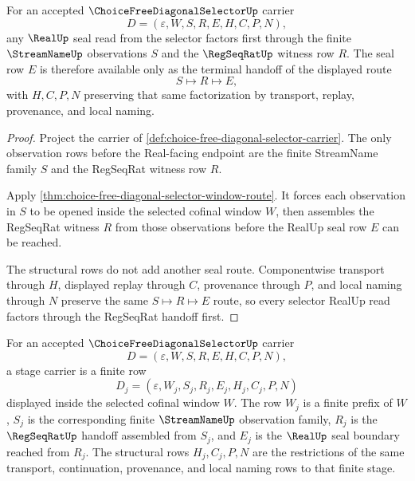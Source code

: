 \begin{theorem}
\label{thm:choice-free-diagonal-selector-regseqrat-seal-factorization}
For an accepted $\ChoiceFreeDiagonalSelectorUp$ carrier
$$
D=(\varepsilon,W,S,R,E,H,C,P,N),
$$
any $\RealUp$ seal read from the selector factors first through the finite $\StreamNameUp$ observations $S$ and the $\RegSeqRatUp$ witness row $R$. The seal row $E$ is therefore available only as the terminal handoff of the displayed route
$$
S\longmapsto R\longmapsto E,
$$
with $H,C,P,N$ preserving that same factorization by transport, replay, provenance, and local naming.
\end{theorem}
\begin{proof}
Project the carrier of \autoref{def:choice-free-diagonal-selector-carrier}. The only observation rows before the Real-facing endpoint are the finite StreamName family $S$ and the RegSeqRat witness row $R$.

Apply \autoref{thm:choice-free-diagonal-selector-window-route}. It forces each observation in $S$ to be opened inside the selected cofinal window $W$, then assembles the RegSeqRat witness $R$ from those observations before the RealUp seal row $E$ can be reached.

The structural rows do not add another seal route. Componentwise transport through $H$, displayed replay through $C$, provenance through $P$, and local naming through $N$ preserve the same $S\longmapsto R\longmapsto E$ route, so every selector RealUp read factors through the RegSeqRat handoff first.
\end{proof}

\begin{definition}
\label{def:choice-free-diagonal-selector-stage-carrier}
For an accepted $\ChoiceFreeDiagonalSelectorUp$ carrier
$$
D=(\varepsilon,W,S,R,E,H,C,P,N),
$$
a stage carrier is a finite row
$$
D_j=(\varepsilon,W_j,S_j,R_j,E_j,H_j,C_j,P,N)
$$
displayed inside the selected cofinal window $W$. The row $W_j$ is a finite prefix of $W$, $S_j$ is the corresponding finite $\StreamNameUp$ observation family, $R_j$ is the $\RegSeqRatUp$ handoff assembled from $S_j$, and $E_j$ is the $\RealUp$ seal boundary reached from $R_j$. The structural rows $H_j,C_j,P,N$ are the restrictions of the same transport, continuation, provenance, and local naming rows to that finite stage.
\end{definition}

